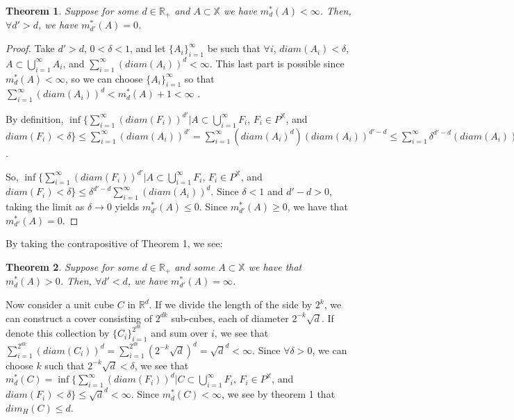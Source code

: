 \newtheorem{theorem}{Theorem}

\begin{theorem} Suppose for some $d \in \mathbb{R}_+$ and $A \subset
  \mathbb{X}$ we have $m_d^*(A)<\infty$. Then, $\forall d'>d$, we have
  $m_{d'}^*(A)=0$.
\end{theorem}

\begin{proof} Take $d'>d$, $0<\delta<1$, and let $\{A_i\}_{i=1}^\infty$ be such
  that $\forall i$, $diam(A_i)<\delta$, $A \subset
  \bigcup\limits_{i=1}^{\infty}A_i$, and
  $\sum\limits_{i=1}^{\infty}(diam(A_i))^d < \infty$. This last part is
  possible since $m_d^*(A)<\infty$, so we can choose $\{A_i\}_{i=1}^\infty$ so
  that $\sum\limits_{i=1}^{\infty}(diam(A_i))^d < m_d^*(A) + 1 < \infty$ . 

  By definition, $\inf \{\sum\limits_{i=1}^{\infty}(diam(F_i))^{d'}|A \subset
  \bigcup\limits_{i=1}^{\infty}F_i$, $F_i \in P^\mathbb{X}$, and
  $diam(F_i)<\delta\}\leq \sum\limits_{i=1}^{\infty} (diam(A_i))^{d'}
  =\sum\limits_{i=1}^{\infty} (diam(A_i)^d)(diam(A_i))^{d'-d}\leq
  \sum\limits_{i=1}^{\infty}\delta^{d'-d}(diam(A_i))^d = \delta^{d'-d}
  \sum\limits_{i=1}^{\infty}(diam(A_i))^d$. 

  So, $\inf \{\sum\limits_{i=1}^{\infty}(diam(F_i))^{d'}|A \subset
  \bigcup\limits_{i=1}^{\infty}F_i$, $F_i \in P^\mathbb{X}$, and
  $diam(F_i)<\delta\}\leq \delta^{d'-d} \sum\limits_{i=1}^{\infty}(diam(A_i))^d$.
  Since $\delta <1$ and $d'-d>0$, taking the limit as $\delta \rightarrow 0$
  yields $m_{d'}^*(A)\leq 0$. Since $m_{d'}^*(A) \geq 0$, we have that
  $m_{d'}^*(A)=0$.
\end{proof}

By taking the contrapositive of Theorem 1, we see:

\begin{theorem} Suppose for some $d \in \mathbb{R}_+$ and some $A \subset
  \mathbb{X}$ we have that $m_d^*(A)>0$. Then, $\forall d'<d$, we have
  $m_{d'}^*(A)=\infty$.  
\end{theorem}

  Now consider a unit cube $C$ in $\mathbb{R}^d$. If we divide the length of
  the side by $2^k$, we can construct a cover consisting of $2^{dk}$ sub-cubes,
  each of diameter $2^{-k}\sqrt{d}$. If denote this collection by
  $\{C_i\}_{i=1}^{2^{dk}}$ and sum over $i$, we see that
  $\sum\limits_{i=1}^{2^{dk}}(diam(C_i))^d
  =\sum\limits_{i=1}^{2^{dk}}(2^{-k}\sqrt{d})^d=\sqrt{d}^d < \infty$. Since
  $\forall \delta>0$, we can choose $k$ such that $2^{-k}\sqrt{d}<\delta$, we
  see that $m_d^*(C)=\inf \{\sum\limits_{i=1}^{\infty}(diam(F_i))^d|C \subset
  \bigcup\limits_{i=1}^{\infty}F_i$, $F_i \in P^\mathbb{X}$, and
$diam(F_i)<\delta\} \leq \sqrt{d}^d < \infty$. Since $m_d^*(C)<\infty$, we see
by theorem 1 that $dim_H(C) \leq d$. 
  
